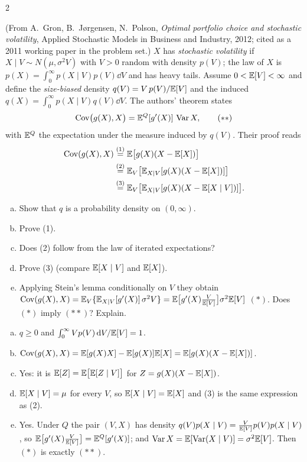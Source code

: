 \begin{paracol}{2}
\begin{exercise}\label{ch03:ex-sv}
(From A.~Gron, B.~J{\o}rgensen, N.~Polson, \emph{Optimal portfolio choice and stochastic volatility}, Applied
Stochastic Models in Business and Industry, 2012; cited as a 2011 working paper in the problem set.)
$X$ has \emph{stochastic volatility} if $X\mid V\sim N(\mu,\sigma^2V)$ with $V>0$ random with density $p(V)$; the
law of $X$ is $p(X)=\int_0^\infty p(X\mid V)p(V)\dd V$ and has heavy tails. Assume $0<\mathbb{E}[V]<\infty$ and define the
\emph{size-biased} density $q(V)=V\,p(V)/\mathbb{E}[V]$ and the induced $q(X)=\int_0^\infty p(X\mid V)q(V)\dd V$. The
authors' theorem states
\[
  \operatorname{Cov}\bigl(g(X),X\bigr)=\mathbb{E}^Q[g'(X)]\,\operatorname{Var} X,\qquad(**)
\]
with $\mathbb{E}^Q$ the expectation under the measure induced by $q(V)$. Their proof reads
\begin{align*}
  \operatorname{Cov}(g(X),X)&\overset{(1)}{=}\mathbb{E}\bigl[g(X)(X-\mathbb{E}[X])\bigr]\\
  &\overset{(2)}{=}\mathbb{E}_V\bigl[\mathbb{E}_{X|V}[g(X)(X-\mathbb{E}[X])]\bigr]\\
  &\overset{(3)}{=}\mathbb{E}_V\bigl[\mathbb{E}_{X|V}[g(X)(X-\mathbb{E}[X\mid V])]\bigr].
\end{align*}
\begin{enumerate}[(a)]
  \item Show that $q$ is a probability density on $(0,\infty)$.
  \item Prove (1).
  \item Does (2) follow from the law of
      iterated expectations?
  \item Prove (3) (compare $\mathbb{E}[X\mid V]$ and $\mathbb{E}[X]$).
  \item Applying Stein's lemma conditionally
      on $V$ they obtain $\operatorname{Cov}(g(X),X)=\mathbb{E}_V\{\mathbb{E}_{X|V}[g'(X)]\,\sigma^2V\}=\mathbb{E}\bigl[g'(X)\tfrac{V}{\mathbb{E}[V]}\bigr]\sigma^2\mathbb{E}[V]$ $(*)$. Does $(*)$
      imply $(**)$? Explain.
\end{enumerate}
\end{exercise}
\begin{solution}[ch03:ex-sv]
\begin{enumerate}[(a)]
  \item $q\ge0$ and $\int_0^\infty Vp(V)\,\mathrm{d} V/\mathbb{E}[V]=1$.
  \item $\operatorname{Cov}(g(X),X)=\mathbb{E}[g(X)X]-\mathbb{E}[g(X)]\mathbb{E}[X]=\mathbb{E}[g(X)(X-\mathbb{E}[X])]$.
  \item Yes: it is $\mathbb{E}[Z]=\mathbb{E}\bigl[\mathbb{E}[Z\mid V]\bigr]$ for $Z=g(X)(X-\mathbb{E}[X])$.
  \item $\mathbb{E}[X\mid V]=\mu$ for every $V$, so $\mathbb{E}[X\mid V]=\mathbb{E}[X]$ and (3) is the same expression as (2).
  \item Yes. Under $Q$ the pair $(V,X)$ has density $q(V)p(X\mid V)=\frac{V}{\mathbb{E}[V]}p(V)p(X\mid V)$, so $\mathbb{E}\bigl[g'(X)\frac{V}{\mathbb{E}[V]}\bigr]=\mathbb{E}^Q[g'(X)]$;
        and $\operatorname{Var} X=\mathbb{E}[\operatorname{Var}(X\mid V)]=\sigma^2\mathbb{E}[V]$. Then $(*)$ is exactly $(**)$.
\end{enumerate}
\end{solution}


\end{paracol}
